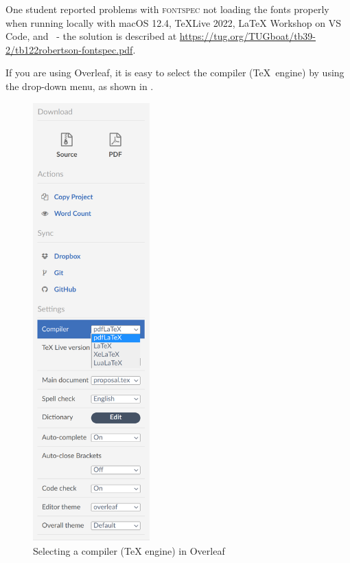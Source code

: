 \documentclass[examplethesis.tex]{subfiles}
\begin{document}
One student reported problems with \textsc{fontspec} not loading the fonts properly when running locally with macOS 12.4, TeXLive 2022, LaTeX Workshop on VS Code, and \XeLaTeX\  - the solution is described at \url{https://tug.org/TUGboat/tb39-2/tb122robertson-fontspec.pdf}.

If you are using Overleaf, it is easy to select the compiler (\ie \TeX\ engine) by using the drop-down menu, as shown in .
\begin{figure}[!ht]
  \begin{center}
    \includegraphics[width=0.40\textwidth]{README_notes/selecting-engine-in-overleaf.png}
  \end{center}
  \caption{Selecting a compiler (\ie TeX engine) in Overleaf}
  \label{fig:selectingTeXEngine}
\end{figure}
\FloatBarrier
\end{document}
